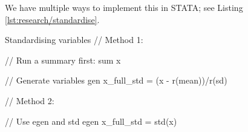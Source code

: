             We have multiple ways to implement this in STATA; see Listing \ref{lst:research/standardise}.

            \begin{sexylisting}[colback=white, label=lst:research/standardise]{Standardising variables}
//  Method 1:

//  Run a summary first:
    sum x

//  Generate variables
    gen x_full_std = (x - r(mean))/r(sd)

//  Method 2:

//  Use egen and std
    egen x_full_std = std(x)
            \end{sexylisting}
            
            

        
        

        
        
            